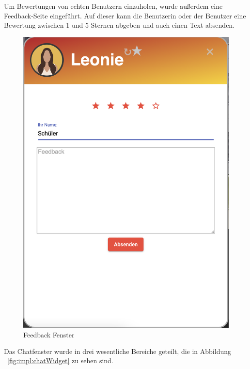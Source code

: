 Um Bewertungen von echten Benutzern einzuholen, wurde außerdem eine Feedback-Seite eingeführt.
Auf dieser kann die Benutzerin oder der Benutzer eine Bewertung zwischen 1 und 5 Sternen abgeben und auch einen Text absenden.

\begin{figure}[hbt!]
    \centering
    \includegraphics[scale=0.35]{pics/feedback}
    \caption{Feedback Fenster}
    \label{fig:impl:feedback}
\end{figure}

Das Chatfenster wurde in drei wesentliche Bereiche geteilt, die in Abbildung ~\ref{fig:impl:chatWidget} zu sehen sind.


